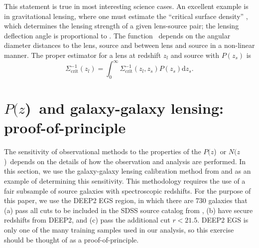 \documentclass[12pt,preprint]{aastex}
\newcommand{\pofz}{$P(z$)}
\newcommand{\nofz}{$N(z$)}
\begin{document}
This statement is true in most interesting science cases.  An excellent example is in
gravitational lensing, where one must estimate the ``critical surface density''
\sigmacrit, which determines the lensing strength of a given lens-source pair; the
lensing deflection angle is proportional to \scinv.  The function
\sigmacrit\ depends on the angular diameter distances to the lens, source and
between lens and source in a non-linear manner.  The proper estimator for a lens
at redshift $z_{l}$ and source with $P(z_s)$ is
\begin{equation} \label{eq:calcscrit}
\Sigma^{-1}_{\mathrm{crit}}(z_l) = 
    \int_{0}^{\infty} \Sigma_{\mathrm{crit}}^{-1}(z_l, z_s) P(z_s) \mathrm{d}z_s.
\end{equation}


\section{\pofz\ and galaxy-galaxy lensing: proof-of-principle} \label{sec:pofp}

The sensitivity of observational methods to the properties of the \pofz\ or
\nofz\ depends on the details of how the observation and analysis are
performed.  In this section, we use the galaxy-galaxy lensing calibration
method from \cite{man08} and \citet{Nakajima11} as an example of determining
this sensitivity.  This methodology requires the use of a fair subsample of
source galaxies with spectroscopic redshifts.  For the purpose of this paper,
we use the DEEP2 EGS region, in which there are 730 galaxies that (a) pass all
cuts to be included in the SDSS source catalog from
\citet{MandelbaumSystematics05}, (b) have secure redshifts from DEEP2, and (c)
pass the additional cut $r<21.5$.  DEEP2 EGS is only one of the many training
samples used in our analysis, so this exercise should be thought of as a
proof-of-principle.
\end{document}
